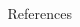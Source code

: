 \documentclass[final,hyperref={pdfpagelabels=false}]{beamer}
\begin{document}
\begin{frame}[t]
\begin{columns}[t]
\begin{column}{0.025\textwidth}\end{column} %

\begin{column}{0.465\textwidth}
\nocite{*} %
\begin{block}{References}
 
 
\end{block}
\end{column}

\begin{column}{0.025\textwidth}\end{column} %

\end{columns}

\end{frame} %
\end{document}
